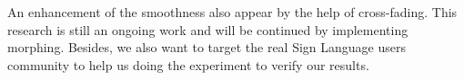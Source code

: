 \documentclass{sig-alternate-05-2015}
\begin{document}
An enhancement of the smoothness also appear by the help of cross-fading. This research is still an ongoing work and will be continued by implementing morphing. Besides, we also want to target the real Sign Language users community to help us doing the experiment to verify our results.

%

%
%



\end{document}
